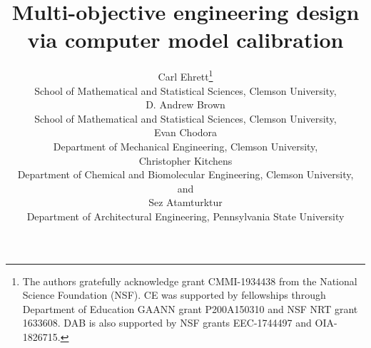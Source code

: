 \documentclass[12pt]{article}
\begin{document}
%

\def\spacingset#1{\renewcommand{\baselinestretch}%
{#1}\small\normalsize} \spacingset{1}



\title{Multi-objective engineering design via computer model calibration}

\author{Carl Ehrett\thanks{
    The authors gratefully acknowledge grant CMMI-1934438 from the National Science Foundation (NSF). CE was supported by fellowships through Department of Education GAANN grant P200A150310 and NSF NRT grant 1633608. DAB is also supported by NSF grants EEC-1744497 and OIA-1826715.}\hspace{.2cm}\\
    School of Mathematical and Statistical Sciences, Clemson University,\\
    D. Andrew Brown \\
    School of Mathematical and Statistical Sciences, Clemson University,\\
    Evan Chodora \\
    Department of Mechanical Engineering, Clemson University,\\
    Christopher Kitchens \\
    Department of Chemical and Biomolecular Engineering, Clemson University,\\
    and \\
    Sez Atamturktur \\
    Department of Architectural Engineering, Pennsylvania State University\\}

\end{document}
